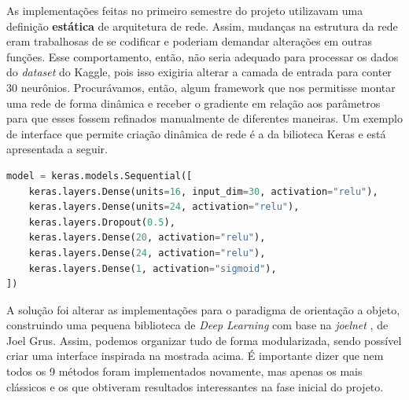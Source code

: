 \documentclass[11pt]{article}
\begin{document}
As implementações feitas no primeiro semestre do projeto utilizavam uma definição \textbf{estática} de arquitetura de rede. Assim, mudanças na estrutura da rede eram trabalhosas de se codificar e poderiam demandar alterações em outras funções. Esse comportamento, então, não seria adequado para processar os dados do \textit{dataset} do Kaggle, pois isso exigiria alterar a camada de entrada para conter 30 neurônios.
 Procurávamos, então, algum framework que nos permitisse montar uma rede de forma dinâmica e receber o gradiente em relação aos parâmetros para que esses fossem refinados manualmente de diferentes maneiras. Um exemplo de interface que permite criação dinâmica de rede é a da bilioteca Keras \cite{KERAS} e está apresentada a seguir.\\
\begin{lstlisting}[language=Python, caption=Interface do Keras]
model = keras.models.Sequential([
    keras.layers.Dense(units=16, input_dim=30, activation="relu"),
    keras.layers.Dense(units=24, activation="relu"),  
    keras.layers.Dropout(0.5),  
    keras.layers.Dense(20, activation="relu"),  
    keras.layers.Dense(24, activation="relu"),  
    keras.layers.Dense(1, activation="sigmoid"),  
])
\end{lstlisting}


\noindent
A solução foi alterar as implementações para o paradigma de orientação a objeto, construindo uma pequena biblioteca de \textit{Deep Learning} com base na \textit{joelnet} \cite{joelnet}, de Joel Grus. Assim, podemos organizar tudo de forma modularizada, sendo possível criar uma interface inspirada na mostrada acima. É importante dizer que nem todos os 9 métodos foram implementados novamente, mas apenas os mais clássicos e os que obtiveram resultados interessantes na fase inicial do projeto.
\end{document}
